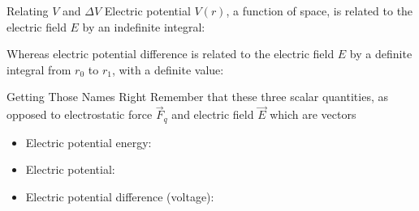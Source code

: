 \documentclass[12pt,aspectratio=169]{beamer}
\begin{document}
\begin{frame}{Relating $V$ and $\Delta V$}
  Electric potential $V(r)$, a function of space, is related to the electric
  field $E$ by an {\color{red}indefinite} integral:


  Whereas electric potential difference is related to the electric field $E$
  by a {\color{blue}definite} integral from $r_0$ to $r_1$, with a definite
  value:
  
\end{frame}



\begin{frame}{Getting Those Names Right}
  Remember that these three scalar quantities, as opposed to electrostatic
  force $\vec F_q$ and electric field $\vec E$ which are vectors
  \begin{itemize}
  \item Electric potential energy:
    
  \item Electric potential:

  \item Electric potential difference (voltage):

  \end{itemize}
\end{frame}



\end{document}
